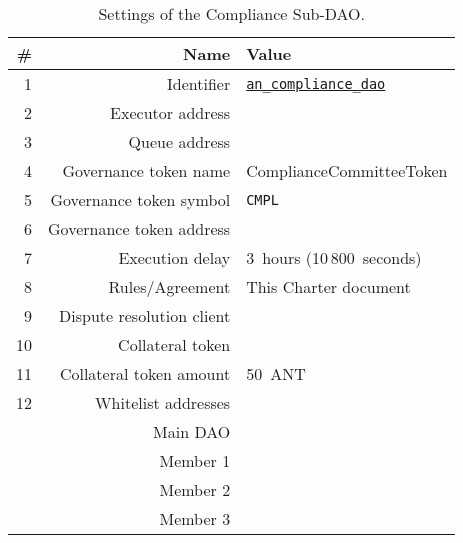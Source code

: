 \begin{table}[h!]
	\caption{Settings of the Compliance Sub-DAO.}
	\centering
	\begin{tabular}{rrl}
		\toprule
		\# & Name & Value \\
		\midrule
		 1 & Identifier 				& \href{https://govern.aragon.org/\#/daos/an_compliance_dao}{\texttt{an\_compliance\_dao}}\\
		 2 & Executor address			& \cmplSubDaoAddr\\
		 3 & Queue address				& \cmplSubDaoQueueAddr\\
		 4 & Governance token name		& ComplianceCommitteeToken\\
		 5 & Governance token symbol	& \texttt{CMPL}\\
		 6 & Governance token address	& \cmplSubDaoTokenAddr\\
		 7 & Execution delay			& 3~hours (10\,800~seconds)\\
		 8 & Rules/Agreement			& This Charter document\\
		 9 & Dispute resolution client	& \aragonCourtAddr\\
		10 & Collateral token			& \antTokenAddr\\
		11 & Collateral token amount	& 50~\ac{ANT}\\
		12 & Whitelist addresses 		& \\
			& Main \ac{DAO} 			& \mainDaoAddr\\
			& Member 1 					& \cmplSubDaoMemberAddrI\\
			& Member 2					& \cmplSubDaoMemberAddrII\\
			& Member 3					& \cmplSubDaoMemberAddrIII\\
		\bottomrule
	\end{tabular}
\end{table}

